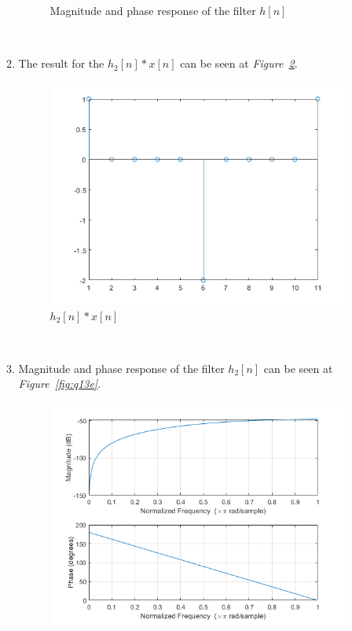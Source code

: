 \documentclass[a4paper,12pt]{article}
\begin{document}
\begin{enumerate}
\begin{enumerate}
\begin{figure}[H]
					\caption{\label{fig:q13c} Magnitude and phase response of the filter $h[n]$ }
				\end{figure} 
				 \-\\[1cm]
			\item The result for the $h_2[n]*x[n]$  can be seen at \textit{Figure~\ref{fig:q13d1}}.
				\begin{figure}[H]
					\centering
					\setlength{\unitlength}{\textwidth} 
					\includegraphics[width=0.6\unitlength]{q13d1}
					\caption{\label{fig:q13d1} $h_2[n]*x[n]$  }
				\end{figure}
				 \-\\[8cm]
			\item Magnitude and phase response of the filter $h_2[n]$  can be seen at \textit{Figure~\ref{fig:q13e}}.
				\begin{figure}[H]
					\centering
					\setlength{\unitlength}{\textwidth} 
					\includegraphics[width=0.9\unitlength]{q13e}

\end{figure}
\end{enumerate}
\end{enumerate}
\end{document}
